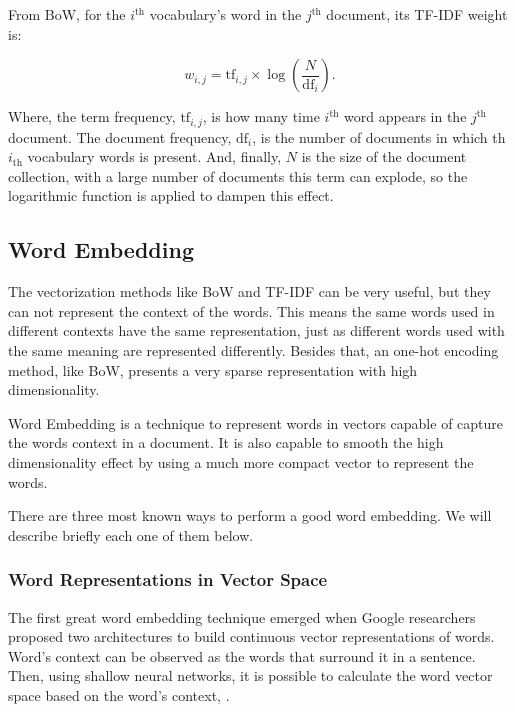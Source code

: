 	From BoW, for the $i^{\text{th}}$ vocabulary's word in the $j^{\text{th}}$ document, its TF-IDF weight is:
	
	\begin{equation}
	\label{eq:tf-idf}
	w_{i, j} = \text{tf}_{i, j} \times \log\left(\dfrac{N}{\text{df}_{i}}\right) \text{.}
	\end{equation}
	
	Where, the term frequency, $\text{tf}_{i, j}$, is how many time $i^{\text{th}}$ word appears in the $j^{\text{th}}$ document. The document frequency, $\text{df}_{i}$, is the number of documents in which th $i_{\text{th}}$ vocabulary words is present. And, finally, $N$ is the size of the document collection, with a large number of documents this term can explode, so the logarithmic function is applied to dampen this effect.
	
	\subsection{Word Embedding}
	
	The vectorization methods like BoW and TF-IDF can be very useful, but they can not represent the context of the words. This means the same words used in different contexts have the same representation, just as different words used with the same meaning are represented differently. Besides that, an one-hot encoding method, like BoW, presents a very sparse representation with high dimensionality. 
	
	Word Embedding is a technique to represent words in vectors capable of capture the words context in a document. It is also capable to smooth the high dimensionality effect by using a much more compact vector to represent the words.	
	
	There are three most known ways to perform a good word embedding. We will describe briefly each one of them below. 
	
	\subsubsection{Word Representations in Vector Space}
	
	The first great word embedding technique emerged when Google researchers proposed two architectures to build continuous vector representations of words. Word's context can be observed as the words that surround it in a sentence. Then, using shallow neural networks, it is possible to calculate the word vector space based on the word's context, \cite{mikolov2013efficient}.
	
